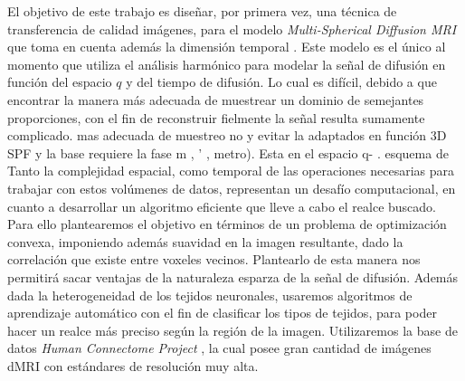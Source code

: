 El objetivo de este trabajo es diseñar, por primera vez, una técnica de transferencia de calidad 
imágenes, para el modelo \textit{Multi-Spherical Diffusion MRI} que toma en cuenta además la 
dimensión temporal 
\citep{Fick}. Este modelo es el \'unico al momento que utiliza el análisis harmónico para modelar la 
señal de difusión 
en función del espacio $q$ y del tiempo de difusión. Lo cual es difícil, debido a que encontrar la 
manera más adecuada 
de muestrear un dominio de semejantes proporciones, con el fin de reconstruir fielmente la señal 
resulta 
sumamente complicado.
mas adecuada de 
%
muestreo no 
y evitar la 
adaptados en función 
3D SPF y la base 
requiere la fase m , 
' , metro). Esta 
en el espacio q- . 
esquema de 
Tanto la complejidad espacial, como temporal de 
las operaciones necesarias para trabajar con estos vol\'umenes de datos, representan un desafío 
computacional, en cuanto 
a desarrollar un algoritmo eficiente que lleve a cabo el realce buscado. Para ello plantearemos el 
objetivo en términos 
de un problema de optimización convexa, imponiendo además suavidad en la imagen resultante, dado la 
correlaci\'on que 
existe entre voxeles vecinos. Plantearlo de esta manera nos permitirá sacar ventajas de la 
naturaleza esparza de la 
señal de difusión. Además dada la heterogeneidad de los tejidos neuronales, usaremos algoritmos de 
aprendizaje 
automático con el fin de clasificar los tipos de tejidos, para poder hacer un realce más preciso 
según la región de la 
imagen. Utilizaremos la base de datos \textit{Human Connectome Project} \citep{Sotiropoulos2013125}, 
la cual posee gran 
cantidad de imágenes dMRI con estándares de 
resolución muy alta.




